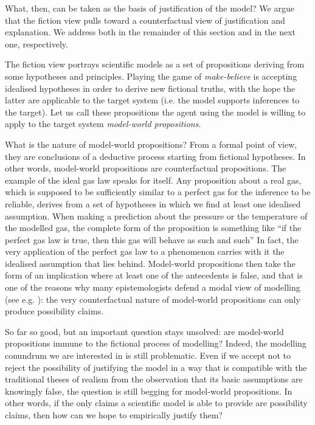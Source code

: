 \documentclass[a4paper,11pt]{article}
\theoremstyle{definition}
\begin{document}
What, then, can be taken as the basis of justification of the model?  We argue that the fiction view pulls toward a counterfactual view of justification and explanation. We address both in the remainder of this section and in the next one, respectively.

The fiction view portrays scientific models as a set of propositions deriving from some hypotheses and principles. Playing the game of \textit{make-believe} is accepting idealised hypotheses in order to derive new fictional truths, with the hope the latter are applicable to the target system (i.e. the model supports inferences to the target). Let us call these propositions the agent using the model is willing to apply to the target system \textit{model-world propositions}.

What is the nature of model-world propositions? From a formal point of view, they are conclusions of a deductive process starting from fictional hypotheses. In other words, model-world propositions are counterfactual propositions. The example of the ideal gas law speaks for itself. Any proposition about a real gas, which is supposed to be sufficiently similar to a perfect gas for the inference to be reliable, derives from a set of hypotheses in which we find at least one idealised assumption. When making a prediction about the pressure or the temperature of the modelled gas, the complete form of the proposition is something like ``if the perfect gas law is true, then this gas will behave as such and such'' In fact, the very application of the perfect gas law to a phenomenon carries with it the idealised assumption that lies behind. Model-world propositions then take the form of an implication where at least one of the antecedents is false, and that is one of the reasons why many epistemologists defend a modal view of modelling (see e.g. \citep{VerreaultJulien2019}): the very counterfactual nature of model-world propositions can only produce possibility claims.

So far so good, but an important question stays unsolved: are model-world propositions immune to the fictional process of modelling? Indeed, the modelling conundrum we are interested in is still problematic. Even if we accept not to reject the possibility of justifying the model in a way that is compatible with the traditional theses of realism from the observation that its basic assumptions are knowingly false, the question is still begging for model-world propositions. In other words, if the only claims a scientific model is able to provide are possibility claims, then how can we hope to empirically justify them?
\end{document}
